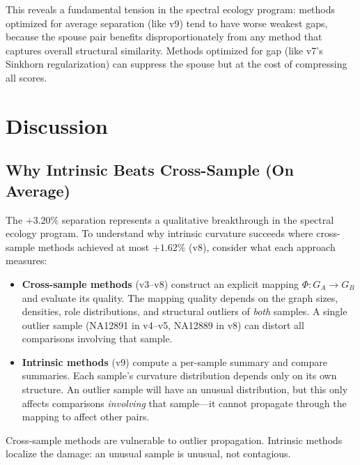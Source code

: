\documentclass{../yalumba}
\begin{document}
This reveals a fundamental tension in the spectral ecology program:
methods optimized for average separation (like v9) tend to have worse
weakest gaps, because the spouse pair benefits disproportionately from
any method that captures overall structural similarity.  Methods
optimized for gap (like v7's Sinkhorn regularization) can suppress
the spouse but at the cost of compressing all scores.


\section{Discussion}
\label{sec:discussion}

\subsection{Why Intrinsic Beats Cross-Sample (On Average)}

The $+3.20\%$ separation represents a qualitative breakthrough in the
spectral ecology program.  To understand why intrinsic curvature succeeds
where cross-sample methods achieved at most $+1.62\%$ (v8), consider what
each approach measures:

\begin{itemize}
  \item \textbf{Cross-sample methods} (v3--v8) construct an explicit mapping
    $\Phi: G_A \to G_B$ and evaluate its quality.  The mapping quality
    depends on the graph sizes, densities, role distributions, and structural
    outliers of \emph{both} samples.  A single outlier sample (NA12891 in
    v4--v5, NA12889 in v8) can distort all comparisons involving that sample.

  \item \textbf{Intrinsic methods} (v9) compute a per-sample summary and
    compare summaries.  Each sample's curvature distribution depends only on
    its own structure.  An outlier sample will have an unusual distribution,
    but this only affects comparisons \emph{involving} that sample---it
    cannot propagate through the mapping to affect other pairs.
\end{itemize}

\begin{pullquote}
Cross-sample methods are vulnerable to outlier propagation.  Intrinsic
methods localize the damage: an unusual sample is unusual, not contagious.
\end{pullquote}
\end{document}
